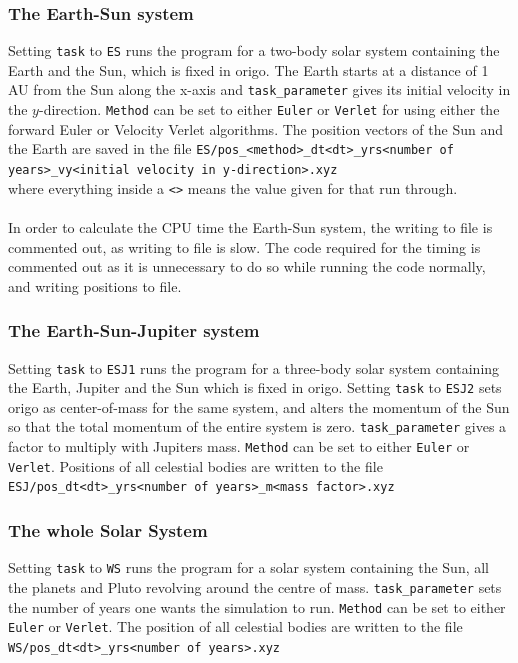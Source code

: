 \documentclass{article}
\begin{document}
\subsubsection{The Earth-Sun system}
Setting \texttt{task} to \texttt{ES} runs the program for a two-body solar system containing the Earth and the Sun, which is fixed in origo. The Earth starts at a distance of 1 AU from the Sun along  the x-axis and \texttt{task\_parameter} gives its initial velocity in the $y$-direction. \texttt{Method} can be set to either \texttt{Euler} or \texttt{Verlet} for using either the forward Euler or Velocity Verlet algorithms. The position vectors of the Sun and the Earth are saved in the file \texttt{ES/pos\_<method>\_dt<dt>\_yrs<number of years>\_vy<initial velocity in y-direction>.xyz}\\ where everything inside a \texttt{<>} means the value given for that run through.\\\\
In order to calculate the CPU time the Earth-Sun system, the writing to file is commented out, as writing to file is slow. The code required for the timing is commented out as it is unnecessary to do so while running the code normally, and writing positions to file.
\subsubsection{The Earth-Sun-Jupiter system}
Setting \texttt{task} to \texttt{ESJ1} runs the program for a three-body solar system containing the Earth, Jupiter and the Sun which is fixed in origo. Setting \texttt{task} to \texttt{ESJ2} sets origo as center-of-mass for the same system, and alters the momentum of the Sun so that the total momentum of the entire system is zero. \texttt{task\_parameter} gives a factor to multiply with Jupiters mass. \texttt{Method} can be set to either \texttt{Euler} or \texttt{Verlet}. 
Positions of all celestial bodies are written to the file \\ \texttt{ESJ/pos\_dt<dt>\_yrs<number of years>\_m<mass factor>.xyz}
\subsubsection{The whole Solar System}
Setting \texttt{task} to \texttt{WS} runs the program for a solar system containing the Sun, all the planets and Pluto revolving around the centre of mass. \texttt{task\_parameter} sets the number of years one wants the simulation to run. \texttt{Method} can be set to either \texttt{Euler} or \texttt{Verlet}. The position of all celestial bodies are written to the file \\ 
\texttt{WS/pos\_dt<dt>\_yrs<number of years>.xyz}
\end{document}
